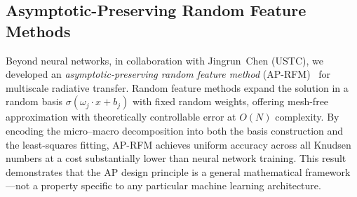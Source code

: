 \subsection{Asymptotic-Preserving Random Feature Methods}

Beyond neural networks, in collaboration with Jingrun~Chen (USTC), we
developed an \emph{asymptotic-preserving random feature method}
(AP-RFM)~\cite{AP-RFM2025} for multiscale radiative transfer.  Random
feature methods expand the solution in a random basis
$\sigma(\omega_j \cdot x + b_j)$ with fixed random weights, offering
mesh-free approximation with theoretically controllable error at
$O(N)$ complexity.  By encoding the micro--macro decomposition into both
the basis construction and the least-squares fitting, AP-RFM achieves uniform
accuracy across all Knudsen numbers at a cost substantially lower than neural
network training.  This result demonstrates that the AP design principle is
a general mathematical framework---not a property specific to any particular
machine learning architecture.
